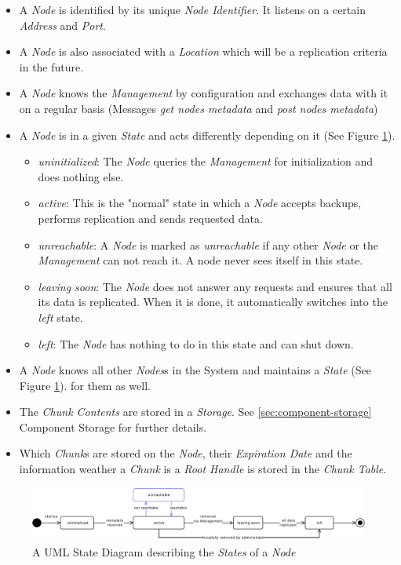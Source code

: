 \begin{itemize}
    \item A \emph{Node} is identified by its unique \emph{Node Identifier}. It listens on a certain \emph{Address} and \emph{Port}.
    \item A \emph{Node} is also associated with a \emph{Location} which will be a replication criteria in the future.
    \item A \emph{Node} knows the \emph{Management} by configuration and exchanges data with it on a regular basis (Messages \emph{get nodes metadata} and \emph{post nodes metadata})
    \item A \emph{Node} is in a given \emph{State} and acts differently depending on it (See Figure \ref{fig:node-states}).
    \begin{itemize}
        \item \emph{uninitialized}: The \emph{Node} queries the \emph{Management} for initialization and does nothing else.
        \item \emph{active}: This is the "normal" state in which a \emph{Node} accepts backups, performs replication and sends requested data.
        \item \emph{unreachable}: A \emph{Node} is marked as \emph{unreachable} if any other \emph{Node} or the \emph{Management} can not reach it. A node never sees itself in this state.
        \item  \emph{leaving soon}: The \emph{Node} does not answer any requests and ensures that all its data is replicated. When it is done, it automatically switches into the \emph{left} state.
        \item \emph{left}: The \emph{Node} has nothing to do in this state and can shut down.
    \end{itemize}
    \item A \emph{Node} knows all other \emph{Nodes}s in the System and maintains a \emph{State} (See Figure \ref{fig:node-states}). for them as well.
    \item The \emph{Chunk Contents} are stored in a \emph{Storage}. See \ref{sec:component-storage} Component Storage for further details.
    \item Which \emph{Chunk}s are stored on the \emph{Node}, their \emph{Expiration Date} and the information weather a \emph{Chunk} is a \emph{Root Handle} is stored in the \emph{Chunk Table}.
\end{itemize}

\begin{figure}[h]
    \centering
    \includegraphics[width=1\linewidth]{resources/node_state}
    \caption[Node States]{A UML State Diagram describing the \emph{States} of a \emph{Node}}
    \label{fig:node-states}
\end{figure}

